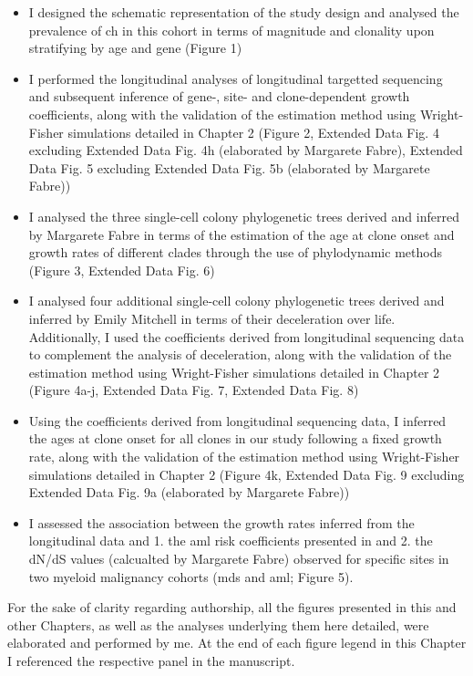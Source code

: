 \begin{itemize}
	\item I designed the schematic representation of the study design and analysed the prevalence of \ac{ch} in this cohort in terms of magnitude and clonality upon stratifying by age and gene (Figure 1)
	\item I performed the longitudinal analyses of longitudinal targetted sequencing and subsequent inference of gene-, site- and clone-dependent growth coefficients, along with the validation of the estimation method using Wright-Fisher simulations detailed in Chapter 2 (Figure 2, Extended Data Fig. 4 excluding Extended Data Fig. 4h (elaborated by Margarete Fabre), Extended Data Fig. 5 excluding Extended Data Fig. 5b (elaborated by Margarete Fabre))
	\item I analysed the three single-cell colony phylogenetic trees derived and inferred by Margarete Fabre in terms of the estimation of the age at clone onset and growth rates of different clades through the use of phylodynamic methods (Figure 3, Extended Data Fig. 6)
	\item I analysed four additional single-cell colony phylogenetic trees derived and inferred by Emily Mitchell in terms of their deceleration over life. Additionally, I used the coefficients derived from longitudinal sequencing data to complement the analysis of deceleration, along with the validation of the estimation method using Wright-Fisher simulations detailed in Chapter 2 (Figure 4a-j, Extended Data Fig. 7, Extended Data Fig. 8)
	\item Using the coefficients derived from longitudinal sequencing data, I inferred the ages at clone onset for all clones in our study following a fixed growth rate, along with the validation of the estimation method using Wright-Fisher simulations detailed in Chapter 2 (Figure 4k, Extended Data Fig. 9 excluding Extended Data Fig. 9a (elaborated by Margarete Fabre))
	\item I assessed the association between the growth rates inferred from the longitudinal data and 1. the \ac{aml} risk coefficients presented in  \cite{Abelson2018-wh} and 2. the dN/dS values (calcualted by Margarete Fabre) observed for specific sites in two myeloid malignancy cohorts (\ac{mds} and \ac{aml}; Figure 5).
\end{itemize}

For the sake of clarity regarding authorship, all the figures presented in this and other Chapters, as well as the analyses underlying them here detailed, were elaborated and performed by me. At the end of each figure legend in this Chapter I referenced the respective panel in the manuscript.

